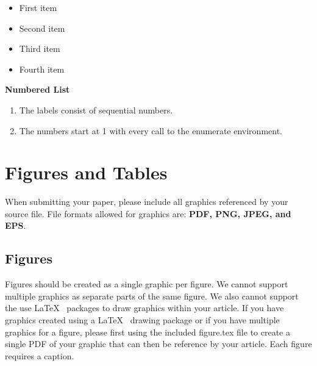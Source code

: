 \documentclass{csmagazine}
\begin{document}
\begin{itemize}
	\itemsep0em 
	\item First item
	\item Second item
	\item Third item
	\item Fourth item
\end{itemize}

\textbf{Numbered List}

\begin{enumerate}
	\item The labels consist of sequential numbers.
	\item The numbers start at 1 with every call to the enumerate environment.
\end{enumerate}




\section{Figures and Tables}

When submitting your paper, please include all graphics referenced by your source file. File formats allowed for graphics are: \textbf{PDF, PNG, JPEG, and EPS}.

\subsection{Figures}

Figures should be created as a single graphic per figure. We cannot support multiple graphics as separate parts of the same figure. We also cannot support the use \LaTeX~ packages to draw graphics within your article. If you have graphics created using a \LaTeX~ drawing package or if you have multiple graphics for a figure, please first using the included figure.tex file to create a single PDF of your graphic that can then be reference by your article. Each figure requires a caption. 

\end{document}
